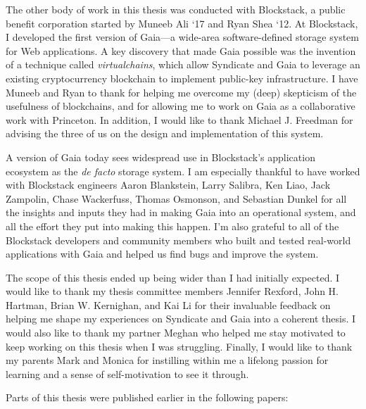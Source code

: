 The other body of work in this thesis was conducted with Blockstack,
a public benefit corporation started by Muneeb Ali `17 and Ryan Shea
`12.  At Blockstack, I developed the first version of Gaia---a wide-area
software-defined storage system for Web applications.  A key discovery that
made Gaia possible was the invention of a technique called \emph{virtualchains},
which allow Syndicate and Gaia to leverage an existing cryptocurrency blockchain to
implement public-key infrastructure.  I have Muneeb and Ryan to thank for
helping me overcome my (deep) skepticism of
the usefulness of blockchains, and for allowing me to work on Gaia as a
collaborative work with Princeton.  In addition, I would like to thank Michael
J. Freedman for advising the three of us on the design and implementation of
this system.

A version of Gaia today sees widespread use in Blockstack's application ecosystem as the
\emph{de facto} storage system.  I am especially thankful to have worked with
Blockstack engineers Aaron Blankstein, Larry Salibra, Ken
Liao, Jack Zampolin, Chase Wackerfuss, Thomas Osmonson, and Sebastian Dunkel for
all the insights and inputs they had in making Gaia into an operational system,
and all the effort they put into making this happen.  I'm also grateful
to all of the Blockstack developers
and community members who built and tested 
real-world applications with Gaia and helped us
find bugs and improve the system.

The scope of this thesis ended up being wider than I had initially expected.
I would like to thank my thesis committee members Jennifer Rexford,
John H. Hartman, Brian W. Kernighan, and Kai Li for their invaluable feedback on
helping me shape my experiences on Syndicate and Gaia into a coherent thesis.
I would also like to thank my partner Meghan who helped me stay
motivated to keep working on this thesis when I was
struggling.  Finally, I would like to thank my parents Mark and Monica for
instilling within me a lifelong passion for learning and a sense of
self-motivation to see it through.

Parts of this thesis were published earlier in the following papers:

